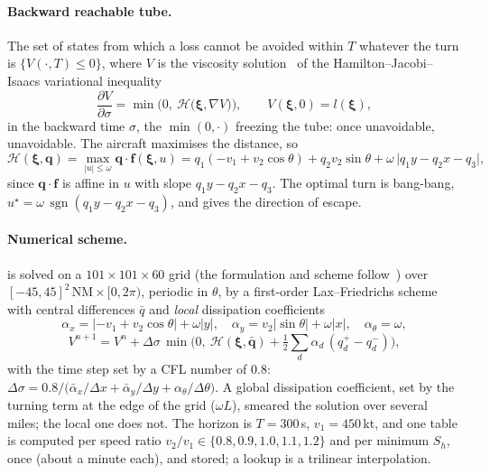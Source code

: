 \documentclass[11pt,a4paper]{article}
\newcommand{\Sh}{S_h}
\newcommand{\NM}{\ensuremath{\,\mathrm{NM}}}
\begin{document}
\paragraph{Backward reachable tube.} The set of states from which a loss cannot be avoided within $T$ whatever the
turn is $\{V(\cdot,T)\le 0\}$, where $V$ is the viscosity solution~\cite{crandall1983} of the Hamilton--Jacobi--Isaacs variational
inequality
\begin{equation}\label{eq:hji}
\frac{\partial V}{\partial \sigma} = \min\Big(0,\ \mathcal H\big(\bm\xi,\nabla V\big)\Big),\qquad V(\bm\xi,0) = l(\bm\xi),
\end{equation}
in the backward time $\sigma$, the $\min(0,\cdot)$ freezing the tube: once unavoidable, unavoidable. The aircraft
maximises the distance, so
\begin{equation}
\mathcal H(\bm\xi,\bm q) = \max_{|u|\le\omega} \bm q\cdot\bm f(\bm\xi,u)
= q_1(-v_1+v_2\cos\theta) + q_2 v_2\sin\theta + \omega\,\big|q_1 y - q_2 x - q_3\big|,
\end{equation}
since $\bm q\cdot\bm f$ is affine in $u$ with slope $q_1y-q_2x-q_3$. The optimal turn is bang-bang,
$u^\star = \omega\,\operatorname{sgn}(q_1y-q_2x-q_3)$, and gives the direction of escape.

\paragraph{Numerical scheme.}  is solved on a $101\times101\times60$ grid (the formulation and scheme follow~\cite{mitchell2005,osher2003}) over
$[-45,45]^2\NM\times[0,2\pi)$, periodic in $\theta$, by a first-order Lax--Friedrichs scheme with central
differences $\bar q$ and \emph{local} dissipation coefficients
\begin{equation}
\alpha_x = |-v_1+v_2\cos\theta| + \omega|y|,\quad \alpha_y = v_2|\sin\theta| + \omega|x|,\quad \alpha_\theta = \omega,
\end{equation}
\begin{equation}
V^{n+1} = V^n + \Delta\sigma\,\min\!\Big(0,\ \mathcal H(\bm\xi,\bar{\bm q}) + \tfrac12\textstyle\sum_d \alpha_d\,(q_d^+-q_d^-)\Big),
\end{equation}
with the time step set by a CFL number of 0.8:
$\Delta\sigma = 0.8/\big(\bar\alpha_x/\Delta x+\bar\alpha_y/\Delta y+\alpha_\theta/\Delta\theta\big)$. A global
dissipation coefficient, set by the turning term at the edge of the grid ($\omega L$), smeared the solution over
several miles; the local one does not. The horizon is $T=300$\,s, $v_1 = 450$\,kt, and one table is computed per
speed ratio $v_2/v_1\in\{0.8,0.9,1.0,1.1,1.2\}$ and per minimum $\Sh$, once (about a minute each), and stored;
a lookup is a trilinear interpolation.
\end{document}
